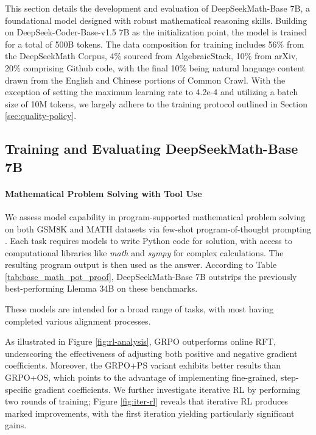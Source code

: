 This section details the development and evaluation of DeepSeekMath-Base 7B, a foundational model designed with robust mathematical reasoning skills. Building on DeepSeek-Coder-Base-v1.5 7B \citep{deepseek-coder} as the initialization point, the model is trained for a total of 500B tokens. The data composition for training includes 56\% from the DeepSeekMath Corpus, 4\% sourced from AlgebraicStack, 10\% from arXiv, 20\% comprising Github code, with the final 10\% being natural language content drawn from the English and Chinese portions of Common Crawl. With the exception of setting the maximum learning rate to 4.2e-4 and utilizing a batch size of 10M tokens, we largely adhere to the training protocol outlined in Section \ref{sec:quality-policy}.

\subsection{Training and Evaluating DeepSeekMath-Base 7B}

\paragraph{Mathematical Problem Solving with Tool Use} We assess model capability in program-supported mathematical problem solving on both GSM8K and MATH datasets via few-shot program-of-thought prompting \citep{pot,pal}. Each task requires models to write Python code for solution, with access to computational libraries like \textit{math} and \textit{sympy} for complex calculations. The resulting program output is then used as the answer. According to Table \ref{tab:base_math_pot_proof}, DeepSeekMath-Base 7B outstrips the previously best-performing Llemma 34B on these benchmarks.

These models are intended for a broad range of tasks, with most having completed various alignment processes.

As illustrated in Figure \ref{fig:rl-analysis}, GRPO outperforms online RFT, underscoring the effectiveness of adjusting both positive and negative gradient coefficients. Moreover, the GRPO+PS variant exhibits better results than GRPO+OS, which points to the advantage of implementing fine-grained, step-specific gradient coefficients. We further investigate iterative RL by performing two rounds of training; Figure \ref{fig:iter-rl} reveals that iterative RL produces marked improvements, with the first iteration yielding particularly significant gains.

